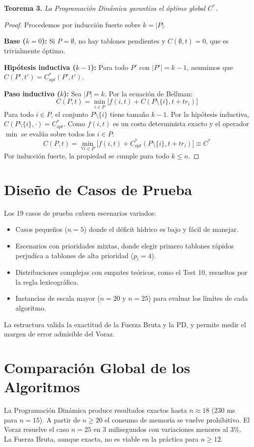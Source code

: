 \documentclass[conference, a4paper]{IEEEtran}
\begin{document}
\textbf{Teorema 3.} \textit{La Programación Dinámica garantiza el óptimo global $C^*$.}

\begin{proof}
Procedemos por inducción fuerte sobre $k = |P|$.

\textbf{Base ($k=0$):} Si $P = \emptyset$, no hay tablones pendientes y $C(\emptyset, t) = 0$, que es trivialmente óptimo.

\textbf{Hipótesis inductiva ($k-1$):} Para todo $P'$ con $|P'| = k-1$, asumimos que $C(P', t') = C^*_{opt}(P', t')$.

\textbf{Paso inductivo ($k$):} Sea $|P| = k$. Por la ecuación de Bellman:
\begin{equation}
C(P, t) = \min_{i \in P} \Big[ f(i, t) + C(P \setminus \{i\}, t + tr_i) \Big]
\end{equation}
Para todo $i \in P$, el conjunto $P \setminus \{i\}$ tiene tamaño $k-1$. Por la hipótesis inductiva, $C(P \setminus \{i\}, \cdot) = C^*_{opt}$. Como $f(i,t)$ es un costo determinista exacto y el operador $\min$ se evalúa sobre todos los $i \in P$:
\begin{equation}
C(P, t) = \min_{\forall i \in P} \Big[ f(i, t) + C_{opt}^*(P \setminus \{i\}, t + tr_i) \Big] \equiv C^*
\end{equation}
Por inducción fuerte, la propiedad se cumple para todo $k \leq n$.
\end{proof}

\section{Diseño de Casos de Prueba}
Los 19 casos de prueba cubren escenarios variados:
\begin{itemize}
    \item Casos pequeños ($n=5$) donde el déficit hídrico es bajo y fácil de manejar.
    \item Escenarios con prioridades mixtas, donde elegir primero tablones rápidos perjudica a tablones de alta prioridad ($p_i=4$).
    \item Distribuciones complejas con empates teóricos, como el Test 10, resueltos por la regla lexicográfica.
    \item Instancias de escala mayor ($n=20$ y $n=25$) para evaluar los límites de cada algoritmo.
\end{itemize}
La estructura valida la exactitud de la Fuerza Bruta y la PD, y permite medir el margen de error admisible del Voraz.

\section{Comparación Global de los Algoritmos}
La Programación Dinámica produce resultados exactos hasta $n \approx 18$ (230 ms para $n=15$). A partir de $n \geq 20$ el consumo de memoria se vuelve prohibitivo. El Voraz resuelve el caso $n=25$ en 3 milisegundos con variaciones menores al 3\%. La Fuerza Bruta, aunque exacta, no es viable en la práctica para $n \geq 12$.
\end{document}
